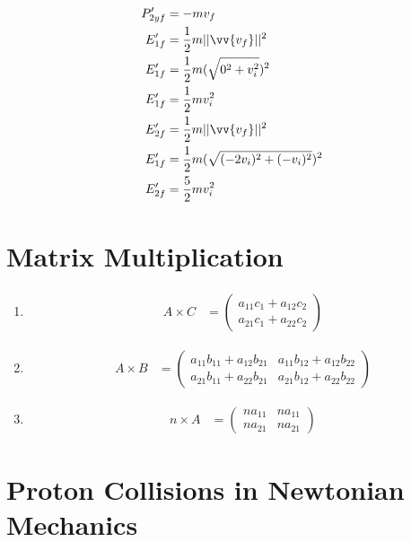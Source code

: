 \documentclass[11pt,letterpaper, twocolumn]{article}
\begin{document}
\begin{enumerate}[label=(\alph*)]
\begin{align*}
        P_{2yf}' &= -mv_f\\
        E_{1f}' &= \frac{1}{2}m||\vv{v_f}||^2\\
        E_{1f}' &= \frac{1}{2}m(\sqrt{0^2 + v_{i}^2})^2\\
        E_{1f}' &= \frac{1}{2}mv_{i}^2\\
        E_{2f}' &= \frac{1}{2}m||\vv{v_f}||^2\\
        E_{1f}' &= \frac{1}{2}m(\sqrt{(-2v_{i})^2 + (-v_{i})^2})^2\\
        E_{2f}' &= \frac{5}{2}mv_{i}^2\\
    \end{align*}
\end{enumerate}

\section{Matrix Multiplication}
\begin{enumerate}[label=(\alph*)]
    \item \begin{align*}
            A \times C &= \begin{pmatrix}
                a_{11}c_{1} + a_{12}c_{2}\\a_{21}c_{1} + a_{22}c_{2}
            \end{pmatrix}
        \end{align*}
    \item \begin{align*}
        A \times B &= \begin{pmatrix}
            a_{11}b_{11} + a_{12}b_{21} & a_{11}b_{12} + a_{12}b_{22}\\
            a_{21}b_{11} + a_{22}b_{21} & a_{21}b_{12} + a_{22}b_{22}
        \end{pmatrix}
    \end{align*}
    \item \begin{align*}
        n \times A &= \begin{pmatrix}
            na_{11} & na_{11}\\
            na_{21} & na_{21}
        \end{pmatrix}
    \end{align*}
\end{enumerate}

\section{Proton Collisions in Newtonian Mechanics}
\end{document}
